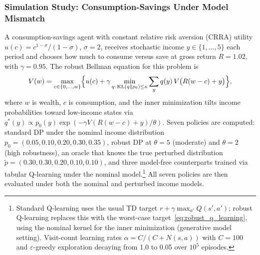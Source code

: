 \subsubsection{Simulation Study: Consumption-Savings Under Model Mismatch}
\label{subsec:sim_robust_consumption}

A consumption-savings agent with constant relative risk aversion (CRRA) utility
$u(c) = c^{1-\sigma}/(1-\sigma)$, $\sigma = 2$, receives stochastic
income $y \in \{1,\ldots,5\}$ each period and chooses how much to consume
versus save at gross return $R = 1.02$, with $\gamma = 0.95$. The robust
Bellman equation for this problem is
\begin{equation}
  V(w) = \max_{c \in \{0,\ldots,w\}} \Bigl\{
    u(c) + \gamma \min_{q:\,\text{KL}(q\|p_0) \leq \kappa}
    \sum_{y} q(y)\, V\bigl(R(w-c) + y\bigr)
  \Bigr\},
  \label{eq:robust_consumption}
\end{equation}
where $w$ is wealth, $c$ is consumption, and the inner minimization tilts
income probabilities toward low-income states via
$q^*(y) \propto p_0(y)\exp(-\gamma V(R(w-c)+y)/\theta)$. Seven policies
are computed: standard DP under the nominal income distribution
$p_0 = (0.05, 0.10, 0.20, 0.30, 0.35)$, robust DP at $\theta = 5$
(moderate) and $\theta = 2$ (high robustness), an oracle that knows the
true perturbed distribution
$\tilde{p} = (0.30, 0.30, 0.20, 0.10, 0.10)$, and three model-free
counterparts trained via tabular Q-learning under the nominal
model.\footnote{Standard Q-learning uses the usual TD target
$r + \gamma \max_{a'} Q(s',a')$; robust Q-learning replaces this with
the worst-case target~\eqref{eq:robust_q_learning}, using the nominal
kernel for the inner minimization (generative model setting).
Visit-count learning rates $\alpha = C/(C + N(s,a))$ with $C = 100$
and $\varepsilon$-greedy exploration decaying from 1.0 to 0.05 over
$10^5$ episodes.} All seven policies are then evaluated under both the
nominal and perturbed income models.

